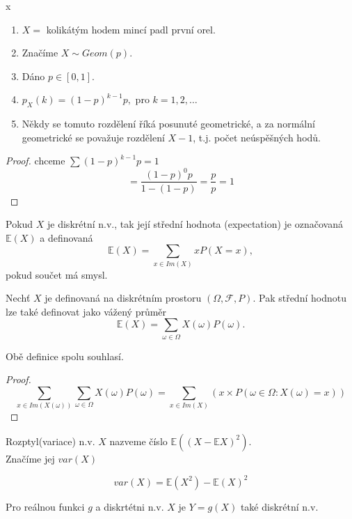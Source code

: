 \documentclass[../main.tex]{subfiles}
\begin{document}
\begin{definition} {\color{white} x}

    \begin{enumerate}
        \item $X =$ kolikátým hodem mincí padl první orel.
        \item Značíme $X \sim Geom(p)$.
        \item Dáno $p\in [0,1]$.
        \item $p_X(k) = (1-p)^{k-1}p,$ pro $k=1,2,\dots$
        \item Někdy se tomuto rozdělení říká posunuté geometrické, a za normální geometrické
        se považuje rozdělení $X-1$, t.j. počet neúspěšných hodů.
    \end{enumerate}
    \begin{proof}
        chceme $\sum (1-p)^{k-1}p = 1$
        \[= \frac{(1-p)^{0}p}{1- (1-p)} = \frac{p}{p} = 1\]
    \end{proof}
\end{definition}
\begin{definition}
    
    Pokud $X$ je diskrétní n.v., tak její střední hodnota (expectation) je označovaná $\mathbb{E}(X)$ a definovaná
    \[\mathbb{E}(X) = \sum_{x\in Im(X)}xP(X=x),\]
    pokud součet má smysl.
    
    Nechť $X$ je definovaná na diskrétním prostoru $(\Omega, \mathcal{F},P)$. Pak střední hodnotu lze také definovat jako vážený průměr
    \[\mathbb{E}(X) = \sum_{\omega \in \Omega} X(\omega)P({\omega}).\] 
\end{definition}

\begin{remark}
    Obě definice spolu souhlasí.
\end{remark}
\begin{proof}
    \[\sum_{x\in Im(X(\omega))} \sum_{\omega \in \Omega} X(\omega) P({\omega}) = \sum_{x\in Im(X)}(x\times P({\omega \in \Omega : X(\omega) = x}))\]
\end{proof}

\begin{definition}[Rozptyl]

    Rozptyl(variace) n.v. $X$ nazveme číslo $\mathbb{E}((X-\mathbb{E}X)^2)$.\\
    Značíme jej $var(X)$

    \begin{theorem}
    \[var(X) = \mathbb{E}(X^2) - \mathbb{E}(X)^2\]
    \end{theorem}
\end{definition}
\begin{definition}

    Pro reálnou funkci $g$ a diskrtétni n.v. $X$ je $Y = g(X)$ také diskrétní n.v.
\end{definition}
\end{document}
